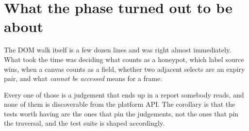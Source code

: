 \section{What the phase turned out to be about}

The DOM walk itself is a few dozen lines and was right almost immediately. What
took the time was deciding what counts as a honeypot, which label source wins,
when a canvas counts as a field, whether two adjacent selects are an expiry pair,
and what \emph{cannot be accessed} means for a frame.

Every one of those is a judgement that ends up in a report somebody reads, and
none of them is discoverable from the platform API. The corollary is that the
tests worth having are the ones that pin the judgements, not the ones that pin
the traversal, and the test suite is shaped accordingly.
